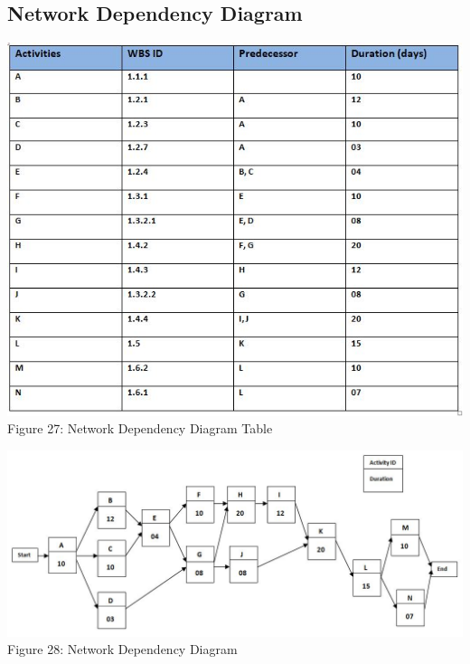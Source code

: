 \documentclass{article}
\begin{document}
\subsection{Network Dependency Diagram}
\begin{center}
\includegraphics[scale=0.8]{nddtable}
\\Figure 27: Network Dependency Diagram Table
\end{center}
\begin{center}
\includegraphics[scale=0.6]{ndd}
\\Figure 28: Network Dependency Diagram
\end{center}
\end{document}
